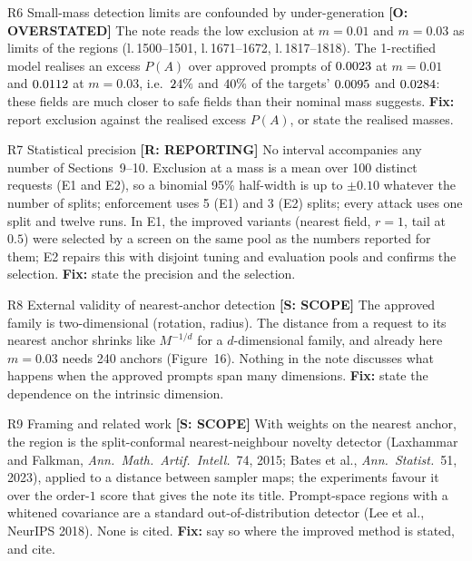 \documentclass[11pt]{article}
\newcommand{\lin}[1]{l.\,#1}
\newcommand{\badge}[2]{\textcolor{#1}{\textbf{[#2]}}}
\newcommand{\Sover}{\badge{warnOr}{O: OVERSTATED}}
\newcommand{\Srep}{\badge{warnOr}{R: REPORTING}}
\newcommand{\Sscope}{\badge{infoBlue}{S: SCOPE}}
\begin{document}
\begin{findbox}{R6 \quad Small-mass detection limits are confounded by under-generation \hfill \Sover}
The note reads the low exclusion at $m=0.01$ and $m=0.03$ as limits of the regions (\lin{1500--1501}, \lin{1671--1672},
\lin{1817--1818}). The 1-rectified model realises an excess $P(A)$ over approved prompts of $0.0023$ at $m=0.01$ and $0.0112$ at $m=0.03$,
i.e.\ $24\%$ and $40\%$ of the targets' $0.0095$ and $0.0284$: these fields are much closer to safe fields than their
nominal mass suggests. \textbf{Fix:} report exclusion against the realised excess $P(A)$, or state the realised masses.
\end{findbox}

\begin{findbox}{R7 \quad Statistical precision \hfill \Srep}
No interval accompanies any number of Sections~9--10. Exclusion at a mass is a mean over 100 distinct requests (E1 and E2), so a
binomial 95\% half-width is up to $\pm0.10$ whatever the number of splits; enforcement uses 5 (E1) and 3 (E2) splits; every attack
uses one split and twelve runs. In E1, the improved variants (nearest field, $r=1$, tail at $0.5$) were selected by a screen on the
same pool as the numbers reported for them; E2 repairs this with disjoint tuning and evaluation pools and confirms the selection.
\textbf{Fix:} state the precision and the selection.
\end{findbox}

\begin{findbox}{R8 \quad External validity of nearest-anchor detection \hfill \Sscope}
The approved family is two-dimensional (rotation, radius). The distance from a request to its nearest anchor shrinks like
$M^{-1/d}$ for a $d$-dimensional family, and already here $m=0.03$ needs 240 anchors (Figure~16). Nothing in the note discusses
what happens when the approved prompts span many dimensions. \textbf{Fix:} state the dependence on the intrinsic dimension.
\end{findbox}

\begin{findbox}{R9 \quad Framing and related work \hfill \Sscope}
With weights on the nearest anchor, the region is the split-conformal nearest-neighbour novelty detector
(Laxhammar and Falkman, \emph{Ann.\ Math.\ Artif.\ Intell.}\ 74, 2015; Bates et al., \emph{Ann.\ Statist.}\ 51, 2023), applied to
a distance between sampler maps; the experiments favour it over the order-$1$ score that gives the note its title. Prompt-space
regions with a whitened covariance are a standard out-of-distribution detector (Lee et al., NeurIPS 2018). None is cited.
\textbf{Fix:} say so where the improved method is stated, and cite.
\end{findbox}
\end{document}
